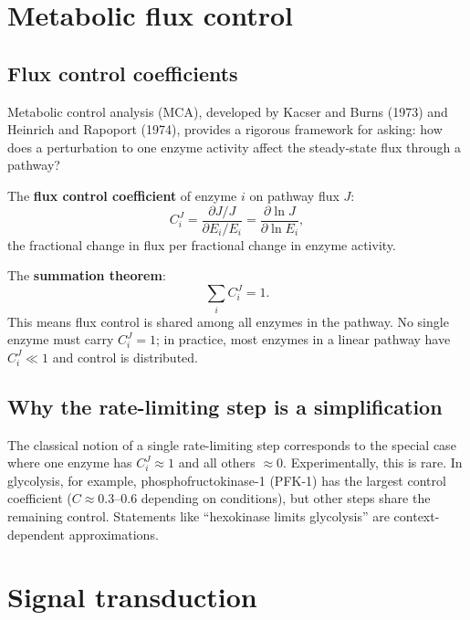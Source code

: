 \documentclass[12pt, a4paper, oneside]{report}
\begin{document}
\section{Metabolic flux control}

\subsection{Flux control coefficients}

Metabolic control analysis (MCA), developed by Kacser and Burns (1973)
and Heinrich and Rapoport (1974), provides a rigorous framework for
asking: how does a perturbation to one enzyme activity affect the
steady-state flux through a pathway?

The \textbf{flux control coefficient} of enzyme $i$ on pathway flux $J$:
\begin{equation}
  C_i^J = \frac{\partial J/J}{\partial E_i/E_i}
        = \frac{\partial \ln J}{\partial \ln E_i},
  \label{eq:fcc}
\end{equation}
the fractional change in flux per fractional change in enzyme activity.

The \textbf{summation theorem}:
\begin{equation}
  \sum_i C_i^J = 1.
  \label{eq:summation}
\end{equation}
This means flux control is shared among all enzymes in the pathway.
No single enzyme must carry $C_i^J = 1$; in practice, most enzymes
in a linear pathway have $C_i^J \ll 1$ and control is distributed.

\subsection{Why the rate-limiting step is a simplification}

The classical notion of a single rate-limiting step corresponds to the
special case where one enzyme has $C_i^J \approx 1$ and all others
$\approx 0$. Experimentally, this is rare. In glycolysis, for example,
phosphofructokinase-1 (PFK-1) has the largest control coefficient
($C \approx 0.3$--$0.6$ depending on conditions), but other steps
share the remaining control. Statements like ``hexokinase limits
glycolysis'' are context-dependent approximations.

\section{Signal transduction}
\end{document}
